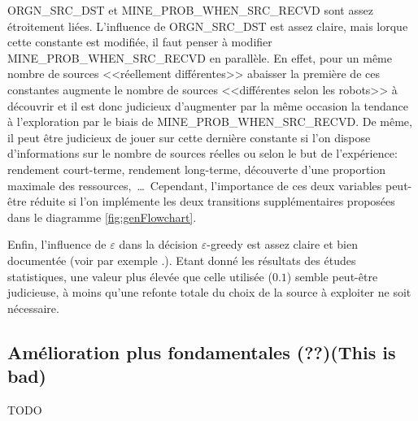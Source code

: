 {\ttfamily ORGN\_SRC\_DST} et {\ttfamily MINE\_PROB\_WHEN\_SRC\_RECVD} sont assez étroitement liées. L'influence de {\ttfamily ORGN\_SRC\_DST} est assez claire, mais lorque cette constante est modifiée, il faut penser à modifier {\ttfamily MINE\_PROB\_WHEN\_SRC\_RECVD} en parallèle. En effet, pour un même nombre de sources <<réellement différentes>> abaisser la première de ces constantes augmente le nombre de sources <<différentes selon les robots>> à découvrir et il est donc judicieux d'augmenter par la même occasion la tendance à l'exploration par le biais de {\ttfamily MINE\_PROB\_WHEN\_SRC\_RECVD}. De même, il peut être judicieux de jouer sur cette dernière constante si l'on dispose d'informations sur le nombre de sources réelles ou selon le but de l'expérience: rendement court-terme, rendement long-terme, découverte d'une proportion maximale des ressources,~\ldots\ Cependant, l'importance de ces deux variables peut-être réduite si l'on implémente les deux transitions supplémentaires proposées dans le diagramme \ref{fig:genFlowchart}.

Enfin, l'influence de $\varepsilon$ dans la décision $\varepsilon$-greedy est assez claire et bien documentée (voir par exemple \cite{foraging}.). Etant donné les résultats des études statistiques, une valeur plus élevée que celle utilisée ($0.1$) semble peut-être judicieuse, à moins qu'une refonte totale du choix de la source à exploiter ne soit nécessaire.

\subsection{Amélioration plus fondamentales (??)(This is bad)}

TODO

